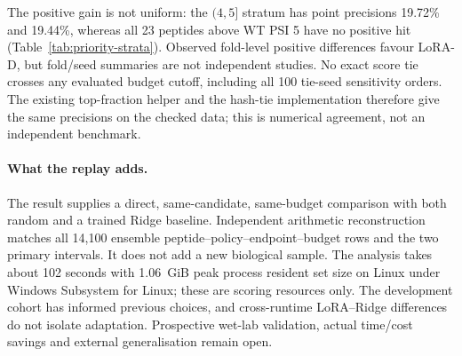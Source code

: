 The positive gain is not uniform: the $(4,5]$ stratum has point precisions 19.72\% and 19.44\%,
whereas all 23 peptides above WT PSI 5 have no positive hit (Table~\ref{tab:priority-strata}).
Observed fold-level positive differences favour LoRA-D, but fold/seed summaries are not
independent studies. No exact score tie crosses any evaluated budget cutoff, including all
100 tie-seed sensitivity orders. The existing top-fraction helper and the hash-tie implementation
therefore give the same precisions on the checked data; this is numerical agreement, not an
independent benchmark.

\paragraph{What the replay adds.}
The result supplies a direct, same-candidate, same-budget comparison with both random and a
trained Ridge baseline. Independent arithmetic reconstruction matches all 14,100 ensemble
peptide--policy--endpoint--budget rows and the two primary intervals. It does not add a new
biological sample. The analysis takes about 102 seconds with 1.06~GiB peak process resident set
size on Linux under Windows Subsystem for Linux; these are scoring resources only. The development cohort has
informed previous choices, and cross-runtime LoRA--Ridge differences do not isolate adaptation.
Prospective wet-lab validation, actual time/cost savings and external generalisation remain open.
